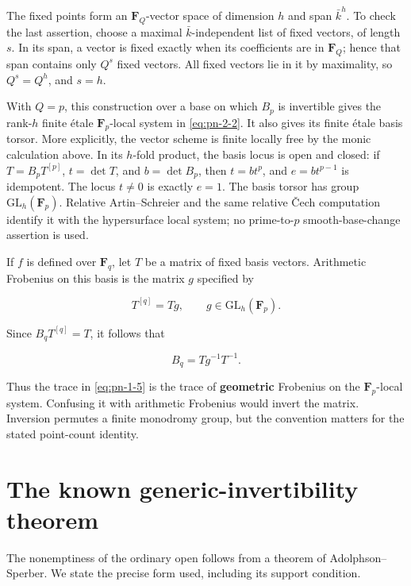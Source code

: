 \documentclass[11pt]{article}
\begin{document}
The fixed points form an \(\mathbf F_Q\)-vector space of dimension \(h\)
and span \(\bar k^h\). To check the last assertion, choose a maximal
\(\bar k\)-independent list of fixed vectors, of length \(s\). In its
span, a vector is fixed exactly when its coefficients are in
\(\mathbf F_Q\); hence that span contains only \(Q^s\) fixed vectors.
All fixed vectors lie in it by maximality, so \(Q^s=Q^h\), and \(s=h\).

With \(Q=p\), this construction over a base on which \(B_p\) is invertible
gives the rank-\(h\) finite étale \(\mathbf F_p\)-local system in \eqref{eq:pn-2-2}.
It also gives its finite étale basis torsor. More explicitly, the vector
scheme is finite locally free by the monic calculation above. In its
\(h\)-fold product, the basis locus is open and closed: if
\(T=B_pT^{[p]}\), \(t=\det T\), and \(b=\det B_p\), then
\(t=bt^p\), and \(e=bt^{p-1}\) is idempotent. The locus \(t\neq0\)
is exactly \(e=1\). The basis torsor has group
\(\mathrm{GL}_h(\mathbf F_p)\). Relative Artin--Schreier and the same
relative Čech computation identify it with the hypersurface local system;
no prime-to-\(p\) smooth-base-change assertion is used.

If \(f\) is defined over \(\mathbf F_q\), let \(T\) be a matrix of fixed
basis vectors. Arithmetic Frobenius on this basis is the matrix \(g\)
specified by

\begin{equation}
 T^{[q]}=Tg,\qquad g\in\mathrm{GL}_h(\mathbf F_p).
\end{equation}

Since \(B_qT^{[q]}=T\), it follows that

\begin{equation}
                         B_q=Tg^{-1}T^{-1}.                            \label{eq:pn-2-4}
\end{equation}

Thus the trace in \eqref{eq:pn-1-5} is the trace of \textbf{geometric} Frobenius on the
\(\mathbf F_p\)-local system. Confusing it with arithmetic Frobenius would
invert the matrix. Inversion permutes a finite monodromy group, but the
convention matters for the stated point-count identity.

\section{The known generic-invertibility theorem}\label{sec:pn-3}
The nonemptiness of the ordinary open follows from a theorem of Adolphson--Sperber. We state the precise form used, including its support condition.
\end{document}
